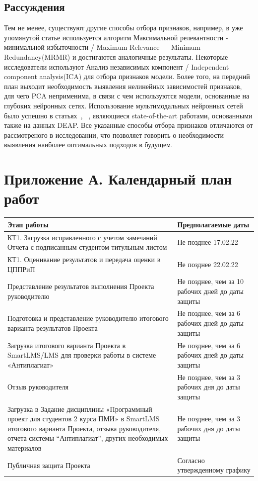 \documentclass{article}
\begin{document}
\subsection{Рассуждения}
Тем не менее, существуют другие способы отбора признаков, например, в уже упомянутой статье\cite{Atkinson} используется алгоритм Максимальной релевантности - минимальной избыточности / Maximum Relevance — Minimum Redundancy(MRMR) и достигаются аналогичные результаты. Некоторые исследователи используют Анализ независимых компонент / Independent component analysis(ICA) для отбора признаков модели. Более того, на передний план выходит необходимость выявления нелинейных зависимостей признаков\cite{Wang}, для чего PCA неприменима, в связи с чем используются модели, основанные на глубоких нейронных сетях. Использование мультимодальных нейронных сетей было успешно в статьях~\cite{Zhao}, ~\cite{Zheng}, являющиеся state-of-the-art работами, основанными также на данных DEAP. Все указанные способы отбора признаков отличаются от рассмотреного в исследовании, что позволяет говорить о необходимости выявления наиболее оптимальных подходов в будущем.




\section*{Приложение А. Календарный план работ}

\setlength{\tabcolsep}{18pt}
\renewcommand{\arraystretch}{1.5}
\begin{tabular}{|m{10cm}|m{5cm}|}
    \hline
    \textbf{Этап работы} & \textbf{Предполагаемые даты}\\
    \hline
    КТ1. Загрузка исправленного с учетом замечаний Отчета с подписанным студентом титульным листом & Не позднее 17.02.22\\
    \hline
    КТ1. Оценивание результатов и передача оценки в ЦППРиП & Не позднее 22.02.22\\
    \hline
    Представление результатов выполнения Проекта руководителю & Не позднее, чем за 10 рабочих дней до даты защиты\\
    \hline
    Подготовка и представление руководителю итогового варианта результатов Проекта & Не позднее, чем за 6 рабочих дней до даты защиты\\
    \hline
    Загрузка итогового варианта Проекта в SmartLMS/LMS для проверки работы в системе «Антиплагиат» & Не позднее, чем за 6 рабочих дней до даты защиты\\
    \hline
    Отзыв руководителя & Не позднее, чем за 3 рабочих дня до даты защиты\\
    \hline
    Загрузка в Задание дисциплины «Программный проект для студентов 2 курса ПМИ» в SmartLMS итогового варианта Проекта, отзыва руководителя, отчета системы “Антиплагиат”, других необходимых материалов & Не позднее, чем за 3 рабочих дня до даты защиты\\
    \hline
    Публичная защита Проекта & Согласно утвержденному графику\\
    \hline  
\end{tabular}
\end{document}
